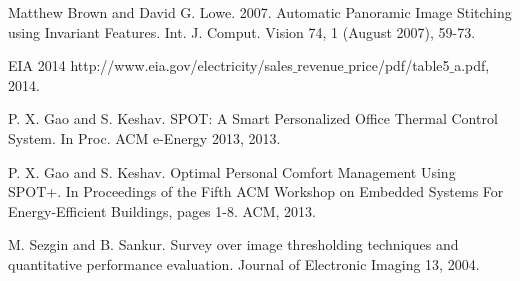  Matthew Brown and David G. Lowe. 2007. Automatic Panoramic Image Stitching using Invariant Features. Int. J. Comput. Vision 74, 1 (August 2007), 59-73.

 EIA 2014  http://www.eia.gov/electricity/sales$\_$revenue$\_$price/pdf/table5$\_$a.pdf, 2014.

 P. X. Gao and S. Keshav. SPOT: A Smart Personalized Office Thermal Control System. In Proc. ACM e-Energy 2013, 2013.

 P. X. Gao and S. Keshav. Optimal Personal Comfort Management Using SPOT+. In Proceedings of the Fifth ACM Workshop on Embedded Systems For Energy-Efficient Buildings, pages 1-8. ACM, 2013.

 M. Sezgin and B. Sankur. Survey over image thresholding techniques and quantitative performance evaluation. Journal of Electronic Imaging 13, 2004.
